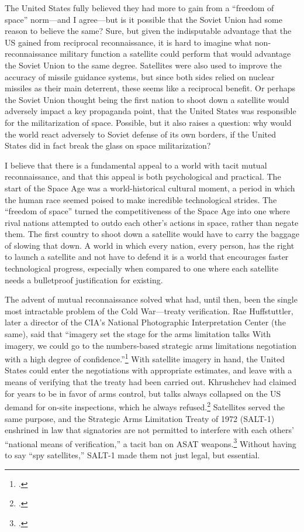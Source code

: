 \documentclass{report}
\begin{document}
The United States fully believed they had more to gain from a ``freedom of space'' norm---and I agree---but is it possible that the Soviet Union had some reason to believe the same? Sure, but given the indisputable advantage that the US gained from reciprocal reconnaissance, it is hard to imagine what non-reconnaissance military function a satellite could perform that would advantage the Soviet Union to the same degree. Satellites were also used to improve the accuracy of missile guidance systems, but since both sides relied on nuclear missiles as their main deterrent, these seems like a reciprocal benefit. Or perhaps the Soviet Union thought being the first nation to shoot down a satellite would adversely impact a key propaganda point, that the United States was responsible for the militarization of space. Possible, but it also raises a question: why would the world react adversely to Soviet defense of its own borders, if the United States did in fact break the glass on space militarization?

I believe that there is a fundamental appeal to a world with tacit mutual reconnaissance, and that this appeal is both psychological and practical. The start of the Space Age was a world-historical cultural moment, a period in which the human race seemed poised to make incredible technological strides. The ``freedom of space'' turned the competitiveness of the Space Age into one where rival nations attempted to outdo each other's actions in space, rather than negate them. The first country to shoot down a satellite would have to carry the baggage of slowing that down. A world in which every nation, every person, has the right to launch a satellite and not have to defend it is a world that encourages faster technological progress, especially when compared to one where each satellite needs a bulletproof justification for existing.

The advent of mutual reconnaissance solved what had, until then, been the single most intractable problem of the Cold War---treaty verification. Rae Huffstuttler, later a director of the CIA's National Photographic Interpretation Center (the same), said that ``imagery set the stage for the arms limitation talks \textelp{} With imagery, we could go to the numbers-based strategic arms limitations negotiation with a high degree of confidence.''\footcite[p.~403]{brugioni_eyes_2010} With satellite imagery in hand, the United States could enter the negotiations with appropriate estimates, and leave with a means of verifying that the treaty had been carried out. Khrushchev had claimed for years to be in favor of arms control, but talks always collapsed on the US demand for on-site inspections, which he always refused.\footcite[p.~255]{mcdougall_heavens_1985} Satellites served the same purpose, and the Strategic Arms Limitation Treaty of 1972 (SALT-1) enshrined in law that signatories are not permitted to interfere with each others' ``national means of verification,'' a tacit ban on ASAT weapons.\footcite[p.~431]{mcdougall_heavens_1985} Without having to say ``spy satellites,'' SALT-1 made them not just legal, but essential.
\end{document}
